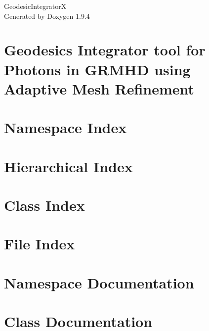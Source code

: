 \documentclass[twoside]{book}
\newcommand{\+}{\discretionary{\mbox{\scriptsize$\hookleftarrow$}}{}{}}
\newcommand{\clearemptydoublepage}{%
    \newpage{\pagestyle{empty}\cleardoublepage}%
  }
\begin{document}
  \raggedbottom
    \hypersetup{pageanchor=false,
                bookmarksnumbered=true,
                pdfencoding=unicode
               }
  \begin{titlepage}
  \vspace*{7cm}
  \begin{center}%
  {\Large Geodesic\+IntegratorX}\\
  \vspace*{1cm}
  {\large Generated by Doxygen 1.9.4}\\
  \end{center}
  \end{titlepage}
  \clearemptydoublepage
  \tableofcontents
  \clearemptydoublepage
  \hypersetup{pageanchor=true}
\chapter{Geodesics Integrator tool for Photons in GRMHD using Adaptive Mesh Refinement}
\label{index}\hypertarget{index}{}
\chapter{Namespace Index}

\chapter{Hierarchical Index}

\chapter{Class Index}

\chapter{File Index}

\chapter{Namespace Documentation}





\chapter{Class Documentation}


\end{document}
